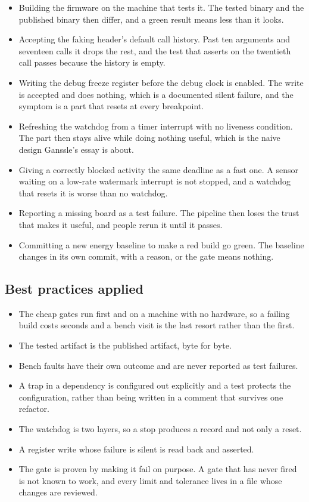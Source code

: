 \begin{itemize}
\item Building the firmware on the machine that tests it. The tested binary and
the published binary then differ, and a green result means less than it looks.
\item Accepting the faking header's default call history. Past ten arguments and
seventeen calls it drops the rest, and the test that asserts on the twentieth
call passes because the history is empty.
\item Writing the debug freeze register before the debug clock is enabled. The
write is accepted and does nothing, which is a documented silent failure, and
the symptom is a part that resets at every breakpoint.
\item Refreshing the watchdog from a timer interrupt with no liveness condition.
The part then stays alive while doing nothing useful, which is the naive design
Ganssle's essay is about.
\item Giving a correctly blocked activity the same deadline as a fast one. A
sensor waiting on a low-rate watermark interrupt is not stopped, and a watchdog
that resets it is worse than no watchdog.
\item Reporting a missing board as a test failure. The pipeline then loses the
trust that makes it useful, and people rerun it until it passes.
\item Committing a new energy baseline to make a red build go green. The
baseline changes in its own commit, with a reason, or the gate means nothing.
\end{itemize}

\subsection*{Best practices applied}

\begin{itemize}
\item The cheap gates run first and on a machine with no hardware, so a failing
build costs seconds and a bench visit is the last resort rather than the first.
\item The tested artifact is the published artifact, byte for byte.
\item Bench faults have their own outcome and are never reported as test
failures.
\item A trap in a dependency is configured out explicitly and a test protects
the configuration, rather than being written in a comment that survives one
refactor.
\item The watchdog is two layers, so a stop produces a record and not only a
reset.
\item A register write whose failure is silent is read back and asserted.
\item The gate is proven by making it fail on purpose. A gate that has never
fired is not known to work, and every limit and tolerance lives in a file whose
changes are reviewed.
\end{itemize}

